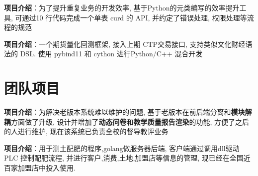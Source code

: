 \documentclass{resume}
\begin{document}
\begin{onehalfspacing}
\textbf{项目介绍}：\quad 为了提升重复业务的开发效率, 基于Python的元类编写的效率提升工具, 可通过10 行代码完成一个单表 curd 的 API, 并约定了错误处理, 权限处理等流程的规范
\end{onehalfspacing}

\begin{onehalfspacing}
\textbf{项目介绍}：\quad 一个期货量化回测框架, 接入上期 CTP交易接口, 支持类似文化财经语法的 DSL. 使用 pybind11 和 cython 进行Python/C++ 混合开发
\end{onehalfspacing} 

\section{\faObjectGroup 团队项目}
\begin{onehalfspacing}
  \textbf{项目介绍}：\quad 为解决老版本系统难以维护的问题, 基于老版本在前后端分离和\textbf{模块解耦}方面做了升级, 设计并增加了\textbf{动态问卷}和\textbf{教学质量报告渲染}的功能, 方便了之后的人进行维护, 现在该系统已负责全校的督导教评业务
\end{onehalfspacing}

\begin{onehalfspacing}
  \textbf{项目介绍}：\quad 用于测土配肥的程序,golang做服务器后端, 客户端通过调用dll驱动 PLC 控制配肥流程,  并进行客户,消费,土地,加盟店等信息的管理, 现已经在全国近百家加盟店中投入使用.
\end{onehalfspacing}
\end{document}
